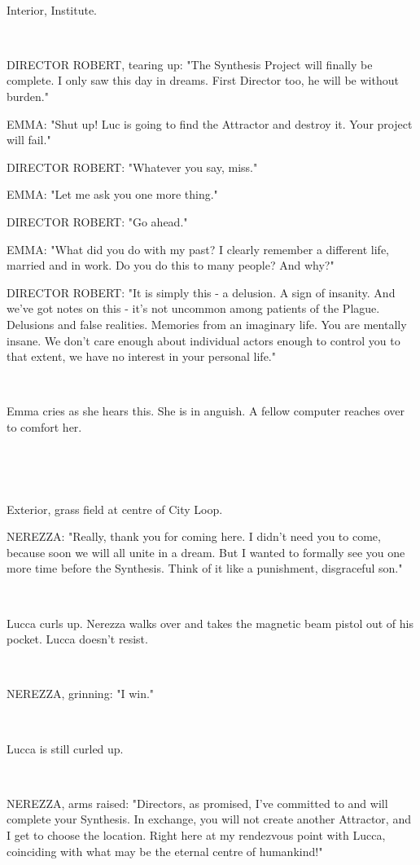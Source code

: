 \documentclass[11pt]{article}
\begin{document}
\ 

Interior, Institute.

\ 

DIRECTOR ROBERT, tearing up: "The Synthesis Project will finally be complete.
I only saw this day in dreams.
First Director too, he will be without burden."

EMMA: "Shut up! Luc is going to find the Attractor and destroy it.
Your project will fail."

DIRECTOR ROBERT: "Whatever you say, miss."

EMMA: "Let me ask you one more thing."

DIRECTOR ROBERT: "Go ahead."

EMMA: "What did you do with my past?
I clearly remember a different life, married and in work.
Do you do this to many people?
And why?"

DIRECTOR ROBERT: "It is simply this - a delusion.
A sign of insanity.
And we've got notes on this - it's not uncommon among patients of the Plague.
Delusions and false realities.
Memories from an imaginary life.
You are mentally insane.
We don't care enough about individual actors enough to control you to that extent, we have no interest in your personal life."

\ 

Emma cries as she hears this. 
She is in anguish.
A fellow computer reaches over to comfort her.

\ 

\ 

Exterior, grass field at centre of City Loop.

NEREZZA: "Really, thank you for coming here.
I didn't need you to come, because soon we will all unite in a dream. 
But I wanted to formally see you one more time before the Synthesis.
Think of it like a punishment, disgraceful son."

\ 

Lucca curls up.
Nerezza walks over and takes the magnetic beam pistol out of his pocket.
Lucca doesn't resist.

\ 

NEREZZA, grinning: "I win."

\ 

Lucca is still curled up.

\ 

NEREZZA, arms raised: "Directors, as promised, I've committed to and will complete your Synthesis.
In exchange, you will not create another Attractor, and I get to choose the location.
Right here at my rendezvous point with Lucca, coinciding with what may be the eternal centre of humankind!"
\end{document}
